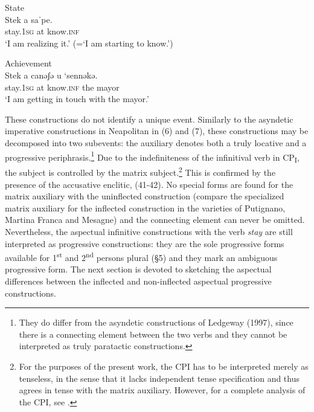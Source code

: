 \documentclass[output=paper]{langsci/langscibook}
\begin{document}
\ea%
         State\label{ex:lorusso:43}\\
    \gll Stek     a  saˈpe.     \\
         stay.\textsc{1sg} at  know.\textsc{inf}  \\
    \glt ‘I am realizing it.’ (=‘I am starting to know.’) 
\z


\ea%
         Achievement\label{ex:lorusso:44}\\
    \gll Stek     a  canəʃə   u  ‘sennəkə.\\
         stay.\textsc{1sg} at   know.\textsc{inf} the   mayor \\
    \glt ‘I am getting in touch with the mayor.’
\z

These constructions do not identify a unique event. Similarly to the asyndetic imperative constructions in Neapolitan \citep{Ledgeway1997} in (6) and (7), these constructions may be decomposed into two subevents: the auxiliary denotes both a truly locative and a progressive periphrasis.\footnote{They do differ from the asyndetic constructions of Ledgeway (1997), since there is a connecting element between the two verbs and they cannot be interpreted as truly paratactic constructions.} Due to the indefiniteness of the infinitival verb in CP\textsubscript{I}, the subject is controlled by the matrix subject.\footnote{For the purposes of the present work, the CPI has to be interpreted merely as tenseless, in the sense that it lacks independent tense specification and thus agrees in tense with the matrix auxiliary. However, for a complete analysis of the CPI, see \citet{Manzini2005,Manzini2007,Manzini2011Bio}.} This is confirmed by the presence of the accusative enclitic, (41-42). No special forms are found for the matrix auxiliary with the uninflected construction (compare the specialized matrix auxiliary for the inflected construction in the varieties of Putignano, Martina Franca and Mesagne) and the connecting element can never be omitted. Nevertheless, the aspectual infinitive constructions with the verb \textit{stay} are still interpreted as progressive constructions: they are the sole progressive forms available for 1\textsuperscript{st} and 2\textsuperscript{nd} persons plural (§5) and they mark an ambiguous progressive form. The next section is devoted to sketching the aspectual differences between the inflected and non-inflected aspectual progressive constructions. 
\end{document}

